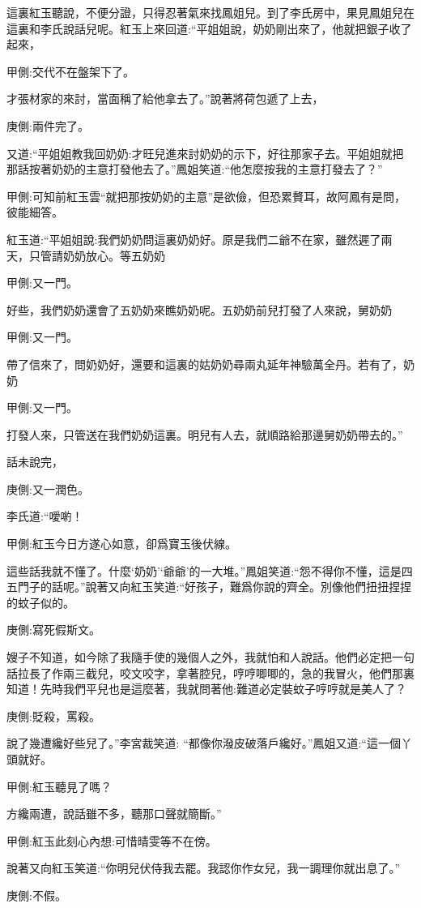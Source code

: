 \begin{parag}
    這裏紅玉聽說，不便分證，只得忍著氣來找鳳姐兒。到了李氏房中，果見鳳姐兒在這裏和李氏說話兒呢。紅玉上來回道:“平姐姐說，奶奶剛出來了，他就把銀子收了起來，\begin{note}甲側:交代不在盤架下了。\end{note}才張材家的來討，當面稱了給他拿去了。”說著將荷包遞了上去，\begin{note}庚側:兩件完了。\end{note}又道:“平姐姐教我回奶奶:才旺兒進來討奶奶的示下，好往那家子去。平姐姐就把那話按著奶奶的主意打發他去了。”鳳姐笑道:“他怎麼按我的主意打發去了？”\begin{note}甲側:可知前紅玉雲“就把那按奶奶的主意”是欲儉，但恐累贅耳，故阿鳳有是問，彼能細答。\end{note}紅玉道:“平姐姐說:我們奶奶問這裏奶奶好。原是我們二爺不在家，雖然遲了兩天，只管請奶奶放心。等五奶奶\begin{note}甲側:又一門。\end{note}好些，我們奶奶還會了五奶奶來瞧奶奶呢。五奶奶前兒打發了人來說，舅奶奶\begin{note}甲側:又一門。\end{note}帶了信來了，問奶奶好，還要和這裏的姑奶奶尋兩丸延年神驗萬全丹。若有了，奶奶\begin{note}甲側:又一門。\end{note}打發人來，只管送在我們奶奶這裏。明兒有人去，就順路給那邊舅奶奶帶去的。”
\end{parag}


\begin{parag}
    話未說完，\begin{note}庚側:又一潤色。\end{note}李氏道:“噯喲！\begin{note}甲側:紅玉今日方遂心如意，卻爲寶玉後伏線。\end{note}這些話我就不懂了。什麼‘奶奶’‘爺爺’的一大堆。”鳳姐笑道:“怨不得你不懂，這是四五門子的話呢。”說著又向紅玉笑道:“好孩子，難爲你說的齊全。別像他們扭扭捏捏的蚊子似的。\begin{note}庚側:寫死假斯文。\end{note}嫂子不知道，如今除了我隨手使的幾個人之外，我就怕和人說話。他們必定把一句話拉長了作兩三截兒，咬文咬字，拿著腔兒，哼哼唧唧的，急的我冒火，他們那裏知道！先時我們平兒也是這麼著，我就問著他:難道必定裝蚊子哼哼就是美人了？\begin{note}庚側:貶殺，罵殺。\end{note}說了幾遭纔好些兒了。”李宮裁笑道: “都像你潑皮破落戶纔好。”鳳姐又道:“這一個丫頭就好。\begin{note}甲側:紅玉聽見了嗎？\end{note}方纔兩遭，說話雖不多，聽那口聲就簡斷。”\begin{note}甲側:紅玉此刻心內想:可惜晴雯等不在傍。\end{note}說著又向紅玉笑道:“你明兒伏侍我去罷。我認你作女兒，我一調理你就出息了。”\begin{note}庚側:不假。\end{note}
\end{parag}


